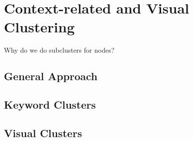 %
\section{Context-related and Visual Clustering}
\label{sec_inhalt}
Why do we do subclusters for nodes?

\subsection{General Approach}


\subsection{Keyword Clusters}


\subsection{Visual Clusters}
